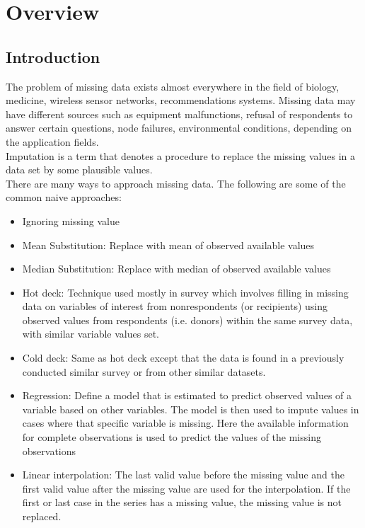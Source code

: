 \chapter{Overview}\label{ch:overview}
\section{Introduction}
The problem of missing data exists almost everywhere in the field of biology, medicine, wireless sensor networks, recommendations systems. Missing data may have different sources such as equipment malfunctions, refusal of respondents to answer certain questions, node failures, environmental conditions, depending on the application fields.
\\
Imputation is a term that denotes a procedure to replace the missing values in a data set by some plausible values. 
\\
There are many ways to approach missing data.  The following are some of the common naive approaches:
\begin{itemize}
\item Ignoring missing value
\item Mean Substitution: Replace with mean of observed available values
\item Median Substitution: Replace with median of observed available values
\item Hot deck: Technique used mostly in survey which involves filling in missing data on variables of interest from nonrespondents (or recipients) using observed values from respondents (i.e. donors) within the same survey data, with similar variable values set.
\item Cold deck:  Same as hot deck except that the data is found in a previously conducted similar survey or from other similar datasets.
\item Regression: Define a model that is estimated to predict observed values of a variable based on other variables. The model is then used to impute values in cases where that specific variable is missing. Here the available information for complete observations is used to predict the values of the missing observations
\item Linear interpolation: The last valid value before the missing value and the first valid value after the missing value are used for the interpolation. If the first or last case in the series has a missing value, the missing value is not replaced.
\end{itemize}

